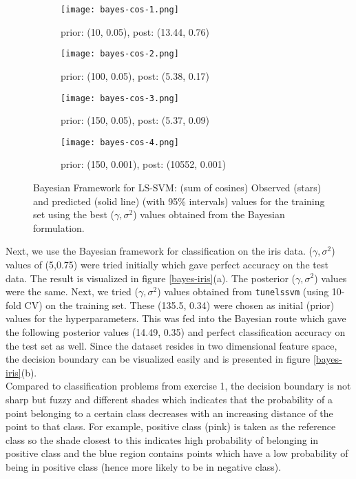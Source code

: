 \documentclass[paper=a4, fontsize=11pt]{scrartcl} %
\numberwithin{equation}{section} %
\begin{document}
\begin{figure}[ht]
\centering
	\begin{subfigure}[b]{0.5\textwidth}
		\centering
		\texttt{[image: bayes-cos-1.png]}
		\caption{prior: (10, 0.05), post: (13.44, 0.76)}
	\end{subfigure}%
	\begin{subfigure}[b]{0.5\textwidth}
		\centering
		\texttt{[image: bayes-cos-2.png]}
		\caption{prior: (100, 0.05), post: (5.38, 0.17)}
	\end{subfigure}
	\begin{subfigure}[b]{0.5\textwidth}
		\centering
		\texttt{[image: bayes-cos-3.png]}
		\caption{prior: (150, 0.05), post: (5.37, 0.09)}
	\end{subfigure}%
	\begin{subfigure}[b]{0.5\textwidth}
		\centering
		\texttt{[image: bayes-cos-4.png]}
		\caption{prior: (150, 0.001), post: (10552, 0.001)}
	\end{subfigure}
\caption{Bayesian Framework for LS-SVM: (sum of cosines) Observed (stars) and predicted (solid line) (with 95\% intervals) values for the training set using the best ($\gamma, \sigma^2$) values obtained from the Bayesian formulation.}
\label{bayes-cos}
\end{figure}

Next, we use the Bayesian framework for classification on the iris data. ($\gamma, \sigma^2$) values of (5,0.75) were tried initially which gave perfect accuracy on the test data. The result is visualized in figure \ref{bayes-iris}(a). The posterior ($\gamma, \sigma^2$) values were the same. Next, we tried ($\gamma, \sigma^2$) values obtained from \texttt{tunelssvm} (using 10-fold CV) on the training set. These (135.5, 0.34) were chosen as initial (prior) values for the hyperparameters. This was fed into the Bayesian route which gave the following posterior values (14.49, 0.35) and perfect classification accuracy on the test set as well. Since the dataset resides in two dimensional feature space, the decision boundary can be visualized easily and is presented in figure \ref{bayes-iris}(b).\\

Compared to classification problems from exercise 1, the decision boundary is not sharp but fuzzy and different shades which indicates that the probability of a point belonging to a certain class decreases with an increasing distance of the point to that class. For example, positive class (pink) is taken as the reference class so the shade closest to this indicates high probability of belonging in positive class and the blue region contains points which have a low probability of being in positive class (hence more likely to be in negative class).\\
\end{document}
